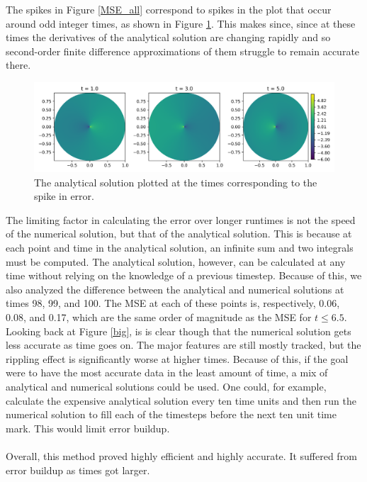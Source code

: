 \documentclass{homework}
\begin{document}
\noindent
The spikes in Figure \ref{MSE_all} correspond to spikes in the plot that occur around odd integer times, as shown in Figure \ref{spikes}. This makes since, since at these times the derivatives of the analytical solution are changing rapidly and so second-order finite difference approximations of them struggle to remain accurate there.
\begin{figure}[H]
    \centering
    \includegraphics[width = \textwidth]{media/singularities.png}
    \caption{The analytical solution plotted at the times corresponding to the spike in error.}
\label{spikes}\end{figure}
\noindent
The limiting factor in calculating the error over longer runtimes is not the speed of the numerical solution, but that of the analytical solution. This is because at each point and time in the analytical solution, an infinite sum and two integrals must be computed. The analytical solution, however, can be calculated at any time without relying on the knowledge of a previous timestep. Because of this, we also analyzed the difference between the analytical and numerical solutions at times 98, 99, and 100. The MSE at each of these points is, respectively, 0.06, 0.08, and 0.17, which are the same order of magnitude as the MSE for $t\leq 6.5$. Looking back at Figure \ref{big}, is is clear though that the numerical solution gets less accurate as time goes on. The major features are still mostly tracked, but the rippling effect is significantly worse at higher times. Because of this, if the goal were to have the most accurate data in the least amount of time, a mix of analytical and numerical solutions could be used. One could, for example, calculate the expensive analytical solution every ten time units and then run the numerical solution to fill each of the timesteps before the next ten unit time mark. This would limit error buildup.
\\ \\ \noindent
Overall, this method proved highly efficient and highly accurate. It suffered from error buildup as times got larger.
\end{document}
